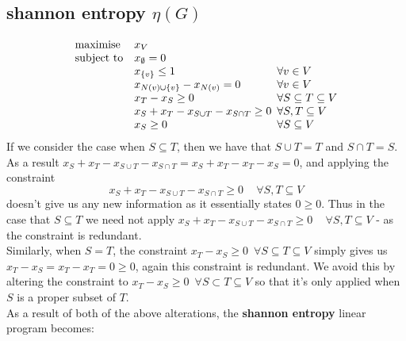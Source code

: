 \documentclass[12pt, a4paper]{article}
\begin{document}
\subsection*{\textbf{shannon entropy} $\eta(G)$}
\begin{equation*}
\begin{array}{ll@{}ll}
\text{maximise}  & x_V &\\
\text{subject to}& x_\emptyset = 0 &\\
                 &           x_{\{v\}} \leq 1  & \, \, \,  \forall v \in V\\
                 &x_{N(v)\cup \{v\}} - x_{N(v)} = 0&  \, \, \, \forall v \in V\\
                 &x_T-x_S \geq 0&  \, \, \, \forall S \subseteq T \subseteq V\\
                 &x_S + x_T - x_{S\cup T} - x_{S\cap T} \geq 0&   \, \, \,  \forall S, T \subseteq V \\
                 &           x_{S} \geq 0 & \, \, \,  \forall S \subseteq V \\
\end{array}
\end{equation*}
If we consider the case when $S \subseteq T$, then we have that $ S \cup T = T$ and $ S \cap T = S$. As a result $x_S + x_T - x_{S\cup T} - x_{S\cap T}  = x_S + x_T - x_T - x_S = 0$, and applying the constraint 
\begin{equation*}
x_S + x_T - x_{S\cup T} - x_{S\cap T} \geq 0  \, \, \, \, \, \, \, \forall S, T \subseteq V
\end{equation*}
doesn't give us any new information as it essentially states $0 \geq 0$. Thus in the case that $S \subseteq T$ we need not  apply $x_S + x_T - x_{S\cup T} - x_{S\cap T} \geq 0  \, \, \, \, \, \, \, \forall S, T \subseteq V$ - as the constraint is redundant.\\ Similarly, when $S=T$, the constraint  $x_T-x_S \geq 0  \, \, \, \forall S \subseteq T \subseteq V$ simply gives us $x_T-x_S = x_T - x_T =  0 \geq 0$, again this constraint is redundant. We avoid this by altering the constraint to  $x_T-x_S \geq 0  \, \, \, \forall S \subset T \subseteq V$ so that it's only applied when $S$ is a proper subset of $T$.\\
As a result of both of the above alterations, the \textbf{shannon entropy} linear program becomes:
\end{document}
